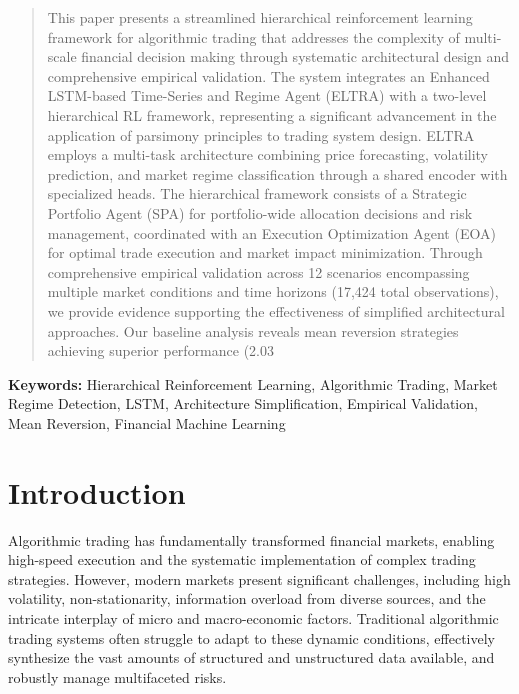 \documentclass[11pt]{article}
\begin{document}
\maketitle

\begin{abstract}
This paper presents a streamlined hierarchical reinforcement learning framework for algorithmic trading that addresses the complexity of multi-scale financial decision making through systematic architectural design and comprehensive empirical validation. The system integrates an Enhanced LSTM-based Time-Series and Regime Agent (ELTRA) with a two-level hierarchical RL framework, representing a significant advancement in the application of parsimony principles to trading system design. ELTRA employs a multi-task architecture combining price forecasting, volatility prediction, and market regime classification through a shared encoder with specialized heads. The hierarchical framework consists of a Strategic Portfolio Agent (SPA) for portfolio-wide allocation decisions and risk management, coordinated with an Execution Optimization Agent (EOA) for optimal trade execution and market impact minimization. Through comprehensive empirical validation across 12 scenarios encompassing multiple market conditions and time horizons (17,424 total observations), we provide evidence supporting the effectiveness of simplified architectural approaches. Our baseline analysis reveals mean reversion strategies achieving superior performance (2.03%
\end{abstract}

\textbf{Keywords:} Hierarchical Reinforcement Learning, Algorithmic Trading, Market Regime Detection, LSTM, Architecture Simplification, Empirical Validation, Mean Reversion, Financial Machine Learning


\section{Introduction}

Algorithmic trading has fundamentally transformed financial markets, enabling high-speed execution and the systematic implementation of complex trading strategies. However, modern markets present significant challenges, including high volatility, non-stationarity, information overload from diverse sources, and the intricate interplay of micro and macro-economic factors. Traditional algorithmic trading systems often struggle to adapt to these dynamic conditions, effectively synthesize the vast amounts of structured and unstructured data available, and robustly manage multifaceted risks.
\end{document}
